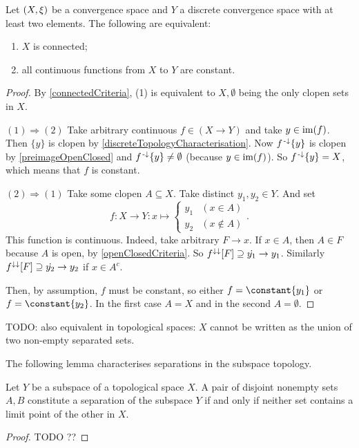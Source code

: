 \begin{proposition} 
Let $\left( X, \xi \right)$ be a convergence space and $Y$ a discrete convergence space with at least two elements. The following are equivalent:
\begin{enumerate}
\item $X$ is connected;
\item all continuous functions from $X$ to $Y$ are constant.
\end{enumerate}
\end{proposition}
\begin{proof}
By \ref{connectedCriteria}, (1) is equivalent to $X,\emptyset$ being the only clopen sets in $X$.

$(1) \Rightarrow (2)$ Take arbitrary continuous $f\in (X\to Y)$ and take $y\in \operatorname{im}(f)$. Then $\{y\}$ is clopen by \ref{discreteTopologyCharacterisation}. Now $f^{\text{\hspace{0.15em}-}\downarrow}\{y\}$ is clopen by \ref{preimageOpenClosed} and $f^{\text{\hspace{0.15em}-}\downarrow}\{y\}\neq \emptyset$ (because $y\in\operatorname{im}(f)$). So $f^{\text{\hspace{0.15em}-}\downarrow}\{y\} = X$, which means that $f$ is constant.

$(2) \Rightarrow (1)$ Take some clopen $A\subseteq X$. Take distinct $y_1,y_2\in Y$. And set
\[ f: X\to Y: x\mapsto \begin{cases}
y_1 & (x\in A) \\
y_2 & (x\notin A)
\end{cases}. \]
This function is continuous. Indeed, take arbitrary $F\to x$. If $x\in A$, then $A\in F$ because $A$ is open, by \ref{openClosedCriteria}. So $f^{\downarrow\downarrow}[F] \supseteq \dot{y_1} \to y_1$. Similarly $f^{\downarrow\downarrow}[F] \supseteq \dot{y_2} \to y_2$ if $x\in A^c$.

Then, by assumption, $f$ must be constant, so either $f = \constant{y_1}$ or $f = \constant{y_2}$. In the first case $A = X$ and in the second $A = \emptyset$.
\end{proof}

TODO: also equivalent in topological spaces: $X$ cannot be written as the union of two non-empty separated sets.

The following lemma characterises separations in the subspace topology.
\begin{lemma}
Let $Y$ be a subspace of a topological space $X$. A pair of disjoint nonempty sets $A,B$ constitute a separation of the subspace $Y$ \textup{if and only if} neither set contains a limit point of the other in $X$.
\end{lemma}
\begin{proof}
TODO ??
\end{proof}


